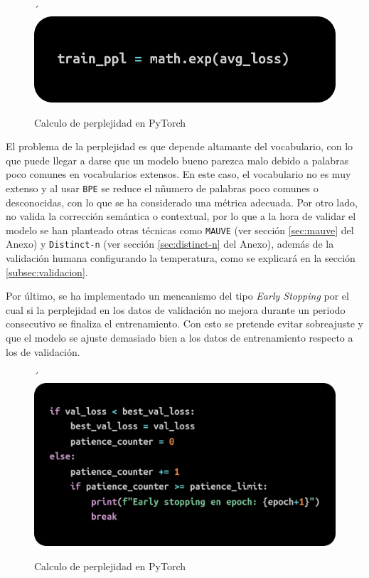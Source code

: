 \documentclass[11pt]{book}
\theoremstyle{plain}
\theoremstyle{definition}
\begin{document}
\begin{figure}[h]
    \centering´
    \includegraphics[width=0.5\linewidth]{img/perplexity.png}
    \caption{Calculo de perplejidad en PyTorch \parencite{stackoverflow_perplexity_pytorch}}
    \label{fig:placeholder21}
\end{figure}

El problema de la perplejidad \parencite{singh2024perplexitymatters} es que depende altamante del vocabulario, con lo que puede llegar a darse que un modelo bueno parezca malo debido a palabras poco comunes en vocabularios extensos. En este caso, el vocabulario no es muy extenso y al usar \texttt{BPE} se reduce el nñumero de palabras poco comunes o desconocidas, con lo que se ha considerado una métrica adecuada. Por otro lado, no valida la corrección semántica o contextual, por lo que a la hora de validar el modelo se han planteado otras técnicas como \texttt{MAUVE} \parencite{krishnap25_mauve_github} (ver sección \ref{sec:mauve} del Anexo) y \texttt{Distinct-n} (ver sección \ref{sec:distinct-n} del Anexo), además de la validación humana configurando la temperatura, como se explicará en la sección \ref{subsec:validacion}.

Por último, se ha implementado un mencanismo del tipo \textit{Early Stopping} por el cual si la perplejidad en los datos de validación no mejora durante un periodo consecutivo se finaliza el entrenamiento. Con esto se pretende evitar sobreajuste y que el modelo se ajuste demasiado bien a los datos de entrenamiento respecto a los de validación.

\begin{figure}[h]
    \centering´
    \includegraphics[width=0.5\linewidth]{img/early_stop.png}
    \caption{Calculo de perplejidad en PyTorch \parencite{stackoverflow_perplexity_pytorch}}
    \label{fig:placeholder23}
\end{figure}
\end{document}
